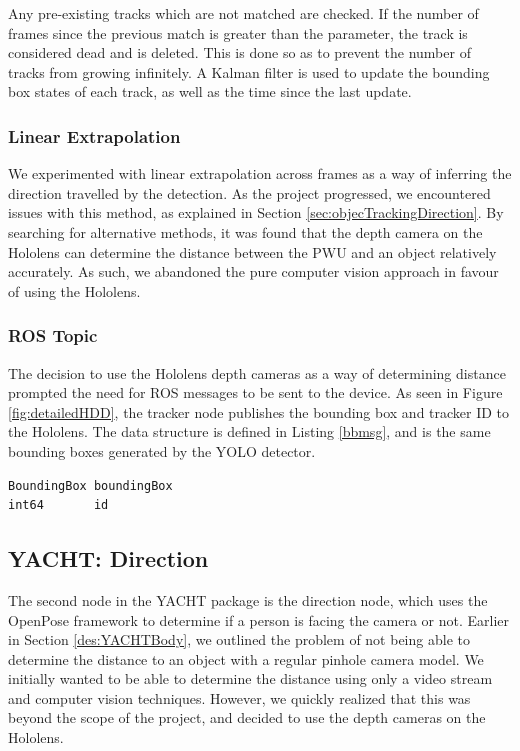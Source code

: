 Any pre-existing tracks which are not matched are checked. If the number of frames since the previous match is greater than the  parameter, the track is considered dead and is deleted. This is done so as to prevent the number of tracks from growing infinitely. A Kalman filter is used to update the bounding box states of each track, as well as the time since the last update.
 
\subsubsection{Linear Extrapolation}
We experimented with linear extrapolation across frames as a way of inferring the direction travelled by the detection. As the project progressed, we encountered issues with this method, as explained in Section \ref{sec:objecTrackingDirection}. By searching for alternative methods, it was found that the depth camera on the Hololens can determine the distance between the PWU and an object relatively accurately. As such, we abandoned the pure computer vision approach in favour of using the Hololens.

\subsubsection{ROS Topic} \label{sec:yachtTrackROS}
The decision to use the Hololens depth cameras as a way of determining distance prompted the need for ROS messages to be sent to the device. As seen in Figure \ref{fig:detailedHDD}, the  tracker node publishes the bounding box and tracker ID to the Hololens. The  data structure is defined in Listing \ref{bbmsg}, and is the same bounding boxes generated by the YOLO detector.

\begin{lstlisting}[language=Mymatlab,caption={ROS message structure for BoundingBoxID.msg}]
BoundingBox boundingBox
int64       id
\end{lstlisting}

\subsection{YACHT: Direction}
The second node in the YACHT package is the direction node, which uses the OpenPose framework to determine if a person is facing the camera or not. Earlier in Section \ref{des:YACHTBody}, we outlined the problem of not being able to determine the distance to an object with a regular pinhole camera model. We initially wanted to be able to determine the distance using only a video stream and computer vision techniques. However, we quickly realized that this was beyond the scope of the project, and decided to use the depth cameras on the Hololens.

